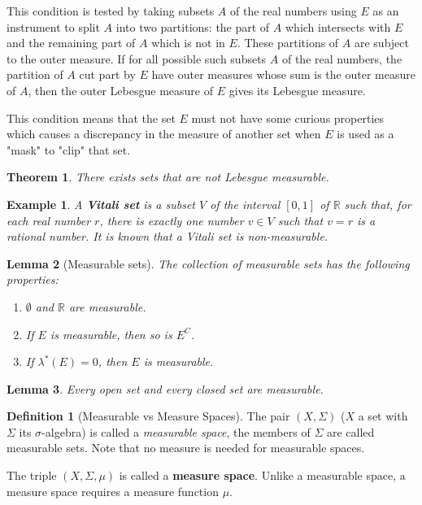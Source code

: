 \documentclass{article}
\newtheorem{theorem}{Theorem}[section]
\newtheorem{lemma}[theorem]{Lemma}
\newtheorem{example}{Example}[section]
\theoremstyle{remark}
\theoremstyle{definition}
\newtheorem{definition}{Definition}[section]
\begin{document}
This condition is tested by taking subsets $A$ of the real numbers using $E$ as an instrument to split $A$ into two partitions: the part of $A$ which intersects with $E$ and the remaining part of $A$ which is not in $E$. These partitions of $A$ are subject to the outer measure. If for all possible such subsets $A$ of the real numbers, the partition of $A$ cut part by $E$ have outer measures whose sum is the outer measure of $A$, then the outer Lebesgue measure of $E$ gives its Lebesgue measure.

This condition means that the set $E$ must not have some curious properties which causes a discrepancy in the measure of another set when $E$ is used as a "mask" to "clip" that set. 

\begin{theorem}
There exists sets that are not Lebesgue measurable. 
\end{theorem}

\begin{example}
A \textbf{Vitali set} is a subset $V$ of the interval $[0,1]$ of $\mathbb{R}$ such that, for each real number $r$, there is exactly one number $v \in V$ such that $v=r$ is a rational number. It is known that a Vitali set is non-measurable. 
\end{example}

\begin{lemma}[Measurable sets]
The collection of measurable sets has the following properties: 
\begin{enumerate}
    \item $\emptyset$ and $\mathbb{R}$ are measurable. 
    \item If $E$ is measurable, then so is $E^C$. 
    \item If $\lambda^* (E) = 0$, then $E$ is measurable. 
\end{enumerate}
\end{lemma}

\begin{lemma}
Every open set and every closed set are measurable. 
\end{lemma}

\begin{definition}[Measurable vs Measure Spaces]
The pair $(X, \Sigma)$ ($X$ a set with $\Sigma$ its $\sigma$-algebra) is called a \textit{measurable space}, the members of $\Sigma$ are called measurable sets. Note that no measure is needed for measurable spaces. 

The triple $(X, \Sigma, \mu)$ is called a \textbf{measure space}. Unlike a measurable space, a measure space requires a measure function $\mu$. 
\end{definition}
\end{document}
